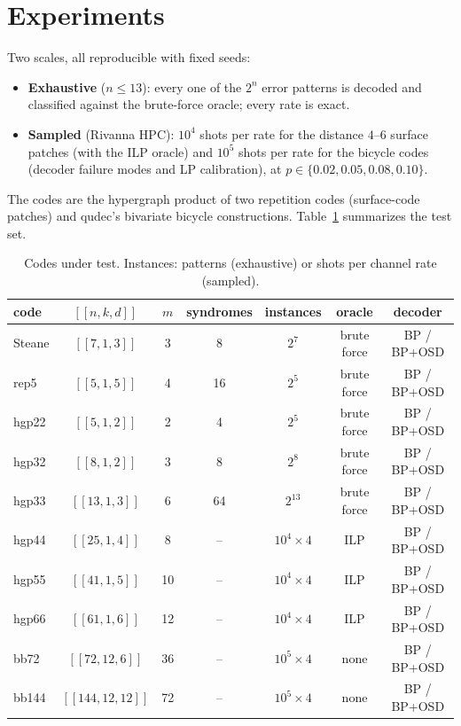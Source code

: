 \documentclass[10pt]{article}
\begin{document}
\section{Experiments}

Two scales, all reproducible with fixed seeds:

\begin{itemize}
\item \textbf{Exhaustive} ($n \le 13$): every one of the $2^n$ error
  patterns is decoded and classified against the brute-force oracle;
  every rate is exact.
\item \textbf{Sampled} (Rivanna HPC): $10^4$ shots per rate for the
  distance $4$--$6$ surface patches (with the ILP oracle) and $10^5$
  shots per rate for the bicycle codes (decoder failure modes and LP
  calibration), at $p \in \{0.02, 0.05, 0.08, 0.10\}$.
\end{itemize}

The codes are the hypergraph product of two repetition codes
(surface-code patches) and qudec's bivariate bicycle constructions.
Table~\ref{tab:codes} summarizes the test set.

\begin{table}[ht]
\centering
\caption{Codes under test. Instances: patterns (exhaustive) or shots
per channel rate (sampled).}
\label{tab:codes}
\begin{tabular}{lcccccc}
\toprule
code & $[[n,k,d]]$ & $m$ & syndromes & instances & oracle & decoder \\
\midrule
Steane & $[[7,1,3]]$ & 3 & 8 & $2^7$ & brute force & BP / BP+OSD \\
rep5 & $[[5,1,5]]$ & 4 & 16 & $2^5$ & brute force & BP / BP+OSD \\
hgp22 & $[[5,1,2]]$ & 2 & 4 & $2^5$ & brute force & BP / BP+OSD \\
hgp32 & $[[8,1,2]]$ & 3 & 8 & $2^8$ & brute force & BP / BP+OSD \\
hgp33 & $[[13,1,3]]$ & 6 & 64 & $2^{13}$ & brute force & BP / BP+OSD \\
hgp44 & $[[25,1,4]]$ & 8 & -- & $10^4 \times 4$ & ILP & BP / BP+OSD \\
hgp55 & $[[41,1,5]]$ & 10 & -- & $10^4 \times 4$ & ILP & BP / BP+OSD \\
hgp66 & $[[61,1,6]]$ & 12 & -- & $10^4 \times 4$ & ILP & BP / BP+OSD \\
bb72 & $[[72,12,6]]$ & 36 & -- & $10^5 \times 4$ & none & BP / BP+OSD \\
bb144 & $[[144,12,12]]$ & 72 & -- & $10^5 \times 4$ & none & BP / BP+OSD \\
\bottomrule
\end{tabular}
\end{table}
\end{document}
